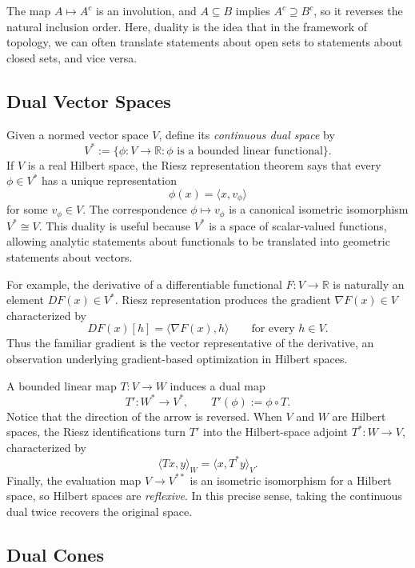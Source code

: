 \documentclass[11pt]{article}
\newcommand{\R}{\mathbb{R}}
\begin{document}
The map $A\mapsto A^c$ is an involution, and $A\subseteq B$ implies
$A^c\supseteq B^c$, so it reverses the natural inclusion order. Here, duality
is the idea that in the framework of topology, we can often translate statements
about open sets to statements about closed sets, and vice versa.

\subsection{Dual Vector Spaces}

Given a normed vector space $V$, define its \emph{continuous dual space} by
\[
  V^*:=\{\phi:V\to\R:\phi\text{ is a bounded linear functional}\}.
\]
If $V$ is a real Hilbert space, the Riesz representation theorem says that
every $\phi\in V^*$ has a unique representation
\[
  \phi(x)=\langle x,v_\phi\rangle
\]
for some $v_\phi\in V$. The correspondence $\phi\mapsto v_\phi$ is a canonical
isometric isomorphism $V^*\cong V$. This duality is useful because $V^*$ is a
space of scalar-valued functions, allowing analytic statements about
functionals to be translated into geometric statements about vectors.

For example, the derivative of a differentiable functional $F:V\to\R$ is
naturally an element $DF(x)\in V^*$. Riesz representation produces the
gradient $\nabla F(x)\in V$ characterized by
\[
  DF(x)[h]=\langle\nabla F(x),h\rangle
  \qquad\text{for every }h\in V.
\]
Thus the familiar gradient is the vector representative of the derivative,
an observation underlying gradient-based optimization in Hilbert spaces.

A bounded linear map $T:V\to W$ induces a dual map
\[
  T':W^*\to V^*,\qquad T'(\phi):=\phi\circ T.
\]
Notice that the direction of the arrow is reversed. When $V$ and $W$ are
Hilbert spaces, the Riesz identifications turn $T'$ into the Hilbert-space
adjoint $T^*:W\to V$, characterized by
\[
  \langle Tx,y\rangle_W=\langle x,T^*y\rangle_V.
\]
Finally, the evaluation map $V\to V^{**}$ is an isometric isomorphism for a
Hilbert space, so Hilbert spaces are \emph{reflexive}. In this precise sense,
taking the continuous dual twice recovers the original space.

\subsection{Dual Cones}
\end{document}
